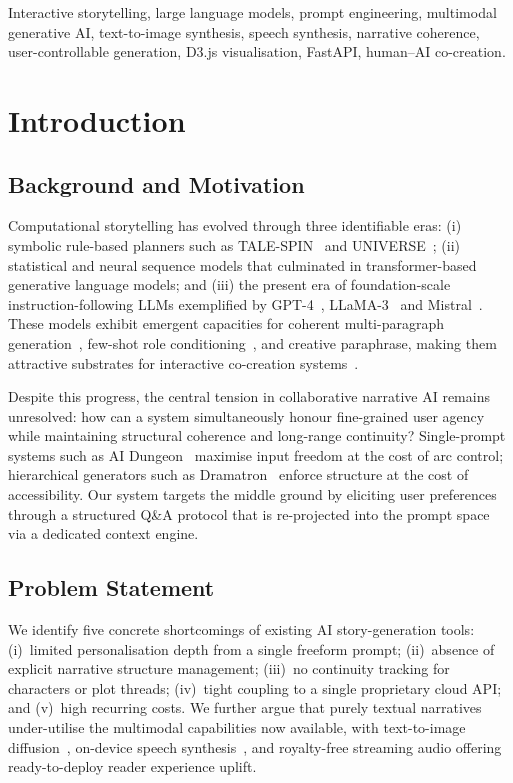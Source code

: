 \documentclass[conference,10pt,a4paper]{IEEEtran}
\begin{document}
\begin{IEEEkeywords}
Interactive storytelling, large language models, prompt engineering,
multimodal generative AI, text-to-image synthesis, speech synthesis,
narrative coherence, user-controllable generation, D3.js visualisation,
FastAPI, human--AI co-creation.
\end{IEEEkeywords}

\section{Introduction}

\subsection{Background and Motivation}
Computational storytelling has evolved through three identifiable
eras: (i) symbolic rule-based planners such as TALE-SPIN~\cite{meehan1977talespin}
and UNIVERSE~\cite{lebowitz1985universe}; (ii) statistical and neural
sequence models that culminated in transformer-based~\cite{vaswani2017attention}
generative language models; and (iii) the present era of foundation-scale
instruction-following LLMs exemplified by GPT-4~\cite{openai2023gpt4},
LLaMA-3~\cite{touvron2023llama} and Mistral~\cite{jiang2023mistral}. These
models exhibit emergent capacities for coherent multi-paragraph
generation~\cite{brown2020gpt3}, few-shot role conditioning~\cite{wei2022cot},
and creative paraphrase, making them attractive substrates for interactive
co-creation systems~\cite{mirowski2023dramatron,chung2022talebrush,liu2023endusers,yuan2022wordcraft}.

Despite this progress, the central tension in collaborative narrative
AI remains unresolved: how can a system simultaneously honour
fine-grained user agency while maintaining structural coherence and
long-range continuity? Single-prompt systems such as AI
Dungeon~\cite{walton2019aidungeon} maximise input freedom at the cost
of arc control; hierarchical generators such as
Dramatron~\cite{mirowski2023dramatron} enforce structure at the cost
of accessibility. Our system targets the middle ground by eliciting
user preferences through a structured Q\&A protocol that is
re-projected into the prompt space via a dedicated context engine.

\subsection{Problem Statement}
We identify five concrete shortcomings of existing AI story-generation
tools: (i)~limited personalisation depth from a single freeform
prompt; (ii)~absence of explicit narrative structure management;
(iii)~no continuity tracking for characters or plot threads;
(iv)~tight coupling to a single proprietary cloud API; and (v)~high
recurring costs. We further argue that purely textual narratives
under-utilise the multimodal capabilities now available, with
text-to-image diffusion~\cite{ramesh2022unclip,podell2024sdxl,bfl2024flux},
on-device speech synthesis~\cite{w3c2024webspeech,casanova2024xtts}, and
royalty-free streaming audio offering ready-to-deploy reader
experience uplift.
\end{document}
